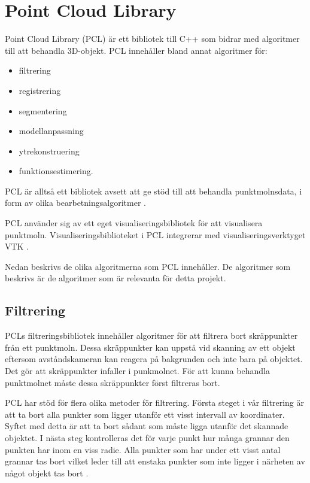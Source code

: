 \section{Point Cloud Library}

Point Cloud Library (PCL) är ett bibliotek till C++ som bidrar med algoritmer till att behandla 3D-objekt. PCL innehåller bland annat algoritmer för:

\begin{itemize}
	\item filtrering
	\item registrering
	\item segmentering
	\item modellanpassning
	\item ytrekonstruering
	\item funktionsestimering.
\end{itemize}
PCL är alltså ett bibliotek avsett att ge stöd till att behandla punktmolnsdata, i form av olika bearbetningsalgoritmer \cite{rusu20113d}.

PCL använder sig av ett eget visualiseringsbibliotek för att visualisera punktmoln. Visualiseringsbiblioteket i PCL integrerar med visualiseringsverktyget VTK \cite{VTK_book}\cite{rusu20113d}.

Nedan beskrivs de olika algoritmerna som PCL innehåller. De algoritmer som beskrivs är de algoritmer som är relevanta för detta projekt.

\subsection{Filtrering}
PCLs filtreringsbibliotek innehåller algoritmer för att filtrera bort skräppunkter från ett punktmoln. Dessa skräppunkter kan uppstå vid skanning av ett objekt eftersom avståndskameran kan reagera på bakgrunden och inte bara på objektet. Det gör att skräppunkter infaller i punkmolnet. För att kunna behandla punktmolnet måste dessa skräppunkter först filtreras bort.

PCL har stöd för flera olika metoder för filtrering. Första steget i vår filtrering är att ta bort alla punkter som ligger utanför ett visst intervall av koordinater. Syftet med detta är att ta bort sådant som måste ligga utanför det skannade objektet. I nästa steg kontrolleras det för varje punkt hur många grannar den punkten har inom en viss radie. Alla punkter som har under ett visst antal grannar tas bort vilket leder till att enstaka punkter som inte ligger i närheten av något objekt tas bort \cite{pcl_filtering}.

